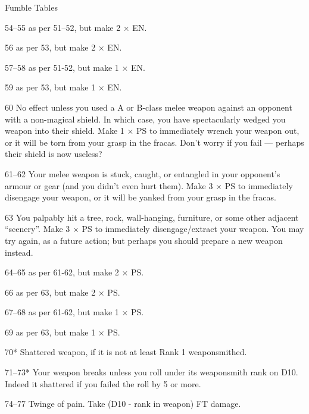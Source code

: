 \begin{Chapter}{Fumble Tables}
\begin{Description}
\item[54–55] as per 51–52, but make 2 × EN.

\item[56] as per 53, but make 2 × EN.

\item[57–58] as per 51-52, but make 1 × EN.

\item[59] as per 53, but make 1 × EN.

\item[60] No effect unless you used a A or B-class melee weapon
  against an opponent with a non-magical shield. In which case, you
  have spectacularly wedged you weapon into their shield. Make 1 × PS
  to immediately wrench your weapon out, or it will be torn from your
  grasp in the fracas. Don’t worry if you fail — perhaps their shield
  is now useless?

\item[61–62] Your melee weapon is stuck, caught, or entangled in your
  opponent’s armour or gear (and you didn’t even hurt them). Make 3 ×
  PS to immediately disengage your weapon, or it will be yanked from
  your grasp in the fracas.

\item[63] You palpably hit a tree, rock, wall-hanging, furniture, or
  some other adjacent “scenery”.  Make 3 × PS to immediately
  disengage/extract your weapon. You may try again, as a future
  action; but perhaps you should prepare a new weapon instead.

\item[64–65] as per 61-62, but make 2 × PS.

\item[66] as per 63, but make 2 × PS.

\item[67–68] as per 61-62, but make 1 × PS.

\item[69] as per 63, but make 1 × PS.

\item[70*] Shattered weapon, if it is not at least Rank 1
  weaponsmithed.

\item[71–73*] Your weapon breaks unless you roll under its weaponsmith
  rank on D10. Indeed it shattered if you failed the roll by 5 or
  more.

\item[74–77] Twinge of pain. Take (D10 - rank in weapon) FT damage.


\end{Description}
\end{Chapter}
